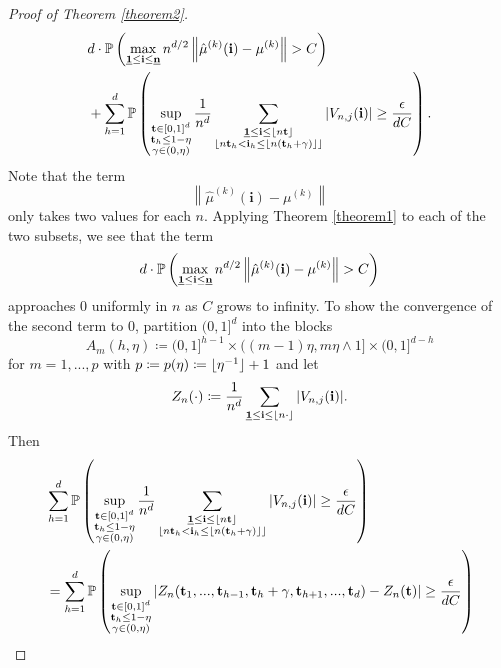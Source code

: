 \begin{proof}[Proof of Theorem \ref{theorem2}]
\begin{align*}
        & d \cdot \PP\left( \max\limits_{\usbf[1] \leq \mathbf{i} \leq \usbf[n]} n^{d/2} \left\| \hat{\mu}^{(k)}(\mathbf{i}) - \mu^{(k)} \right\| > C \right) \\
        & + \sum\limits_{h=1}^d \PP\left(\sup\limits_{\substack{\mathbf{t} \in [0,1]^d \\ \mathbf{t}_h \leq 1 - \eta \\ \gamma \in (0,\eta)}} \frac{1}{n^{d}} \sum\limits_{\substack{\usbf[1] \leq \mathbf{i} \leq \floor{n \mathbf{t}} \\ \floor{n \mathbf{t}_h < \mathbf{i}_h \leq \floor{n(\mathbf{t}_h+\gamma)}}}}  \left| V_{n, j}(\mathbf{i}) \right|  \geq \frac{\epsilon}{dC} \right).
    \end{align*}
    Note that the term 
    \[ \left\| \hat{\mu}^{(k)}(\mathbf{i}) - \mu^{(k)} \right\| \]
    only takes two values for each $n$. Applying Theorem \ref{theorem1} to each of the two subsets, we see that the term
    \[ d \cdot \PP\left( \max\limits_{\usbf[1] \leq \mathbf{i} \leq \usbf[n]} n^{d/2} \left\| \hat{\mu}^{(k)}(\mathbf{i}) - \mu^{(k)} \right\| > C \right) \]
    approaches $0$ uniformly in $n$ as $C$ grows to infinity.
    To show the convergence of the second term to $0$, partition $(0,1]^d$ into the blocks
    \[ A_m(h, \eta) \coloneqq (0, 1]^{h-1} \times ((m-1)\eta, m\eta \wedge 1] \times (0, 1]^{d-h}  \]
    for $m=1, ..., p$ with $p \coloneqq p(\eta) \coloneqq \lfloor\eta^{-1}\rfloor+1$ and let
    \[ Z_n(\cdot) \coloneqq \frac{1}{n^d} \sum\limits_{\usbf[1] \leq \mathbf{i} \leq \floor{n \cdot}} |V_{n, j}(\mathbf{i})|. \]
    Then
    \begin{align*}
        & \sum\limits_{h=1}^d \PP\left(\sup\limits_{\substack{\mathbf{t} \in [0,1]^d \\ \mathbf{t}_h \leq 1 - \eta \\ \gamma \in (0,\eta)}} \frac{1}{n^{d}} \sum\limits_{\substack{\usbf[1] \leq \mathbf{i} \leq \floor{n \mathbf{t}} \\ \floor{n \mathbf{t}_h < \mathbf{i}_h \leq \floor{n(\mathbf{t}_h+\gamma)}}}}  \left| V_{n, j}(\mathbf{i}) \right|  \geq \frac{\epsilon}{dC} \right) \\
        & = \sum\limits_{h=1}^d \PP\left(\sup\limits_{\substack{\mathbf{t} \in [0,1]^d \\ \mathbf{t}_h \leq 1 - \eta \\ \gamma \in (0,\eta)}} \left| Z_n(\mathbf{t}_1, ..., \mathbf{t}_{h-1}, \mathbf{t}_h+\gamma, \mathbf{t}_{h+1}, ..., \mathbf{t}_d) - Z_n(\mathbf{t}) \right| \geq \frac{\epsilon}{dC} \right) \\

\end{align*}
\end{proof}
